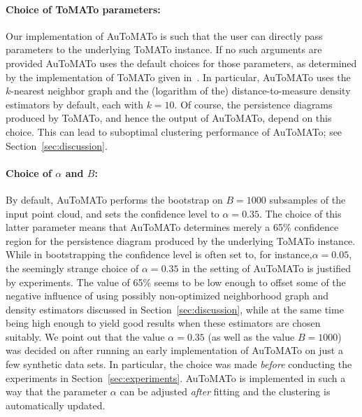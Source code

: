 \documentclass[10pt]{article} %
\theoremstyle{plain}
\newcommand{\aut}{AuToMATo\xspace}
\newcommand{\tom}{ToMATo\xspace}
\begin{document}
\paragraph{Choice of \tom parameters:} Our implementation of \aut is such that the user can directly pass parameters to the underlying \tom instance. If no such arguments are provided \aut uses the default choices for those parameters, as determined by the implementation of \tom given in~\citet{gudhi:PersistenceBasedClustering}. In particular, \aut uses the \(k\)-nearest neighbor graph and the (logarithm of the) distance-to-measure density estimators by default, each with \(k=10\).
Of course, the persistence diagrams produced by \tom, and hence the output of \aut, depend on this choice. This can lead to suboptimal clustering performance of \aut; see Section~\ref{sec:discussion}.

\paragraph{Choice of \(\alpha\) and \(B\):} By default, \aut performs the bootstrap on \(B=1000\) subsamples of the input point cloud, and sets the confidence level to \(\alpha=0.35\). The choice of this latter parameter means that \aut determines merely a 65\% confidence region for the persistence diagram produced by the underlying \tom instance. While in bootstrapping the confidence level is often set to, for instance,\(\alpha=0.05\), the seemingly strange choice of \(\alpha=0.35\) in the setting of \aut is justified by experiments. The value of 65\% seems to be low enough to offset some of the negative influence of using possibly non-optimized neighborhood graph and density estimators discussed in Section~\ref{sec:discussion}, while at the same time being high enough to yield good results when these estimators are chosen suitably. We point out that the value \(\alpha=0.35\) (as well as the value \(B=1000\)) was decided on after running an early implementation of \aut on just a few synthetic data sets. In particular, the choice was made \emph{before} conducting the experiments in Section~\ref{sec:experiments}. \aut is implemented in such a way that the parameter \(\alpha\) can be adjusted \emph{after} fitting and the clustering is automatically updated.
\end{document}
